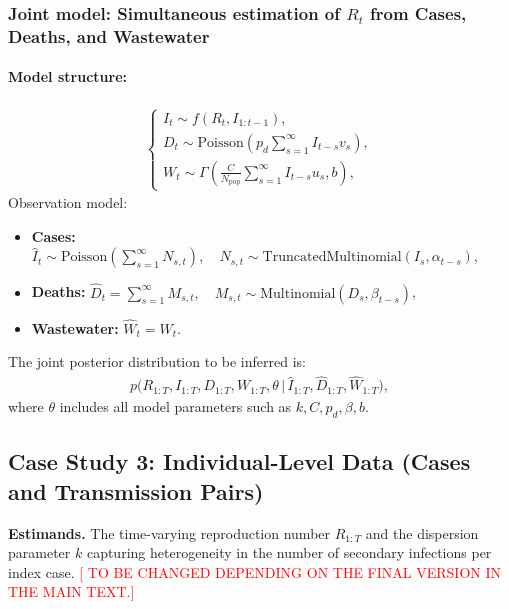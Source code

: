 \documentclass{article}
\begin{document}
\subsubsection{Joint model: Simultaneous estimation of $R_t$ from Cases, Deaths, and Wastewater}

\paragraph{Model structure:}

\begin{align}
\begin{cases}
I_t \sim f(R_t, I_{1:t-1}), \\[6pt]
D_t \sim \mathrm{Poisson}\left(p_d \sum_{s=1}^\infty I_{t-s} v_s \right), \\[6pt]
W_t \sim \Gamma\left(\frac{C}{N_{\mathrm{pop}}} \sum_{s=1}^\infty I_{t-s} u_s, b \right),
\end{cases}
\end{align}
Observation model:
\begin{itemize}
    \item \textbf{Cases:} $\widehat{I}_t \sim \mathrm{Poisson}\left(\sum_{s=1}^\infty N_{s,t}\right), \quad N_{s,t} \sim \mathrm{TruncatedMultinomial}(I_s, \alpha_{t-s})$,
    \item \textbf{Deaths:} $\widehat{D}_t = \sum_{s=1}^\infty M_{s,t}, \quad M_{s,t} \sim \mathrm{Multinomial}(D_s, \beta_{t-s})$,
    \item \textbf{Wastewater:} $\widehat{W}_t = W_t$.
\end{itemize}
The joint posterior distribution to be inferred is:
\begin{align}
p\big(R_{1:T}, I_{1:T}, D_{1:T}, W_{1:T}, \theta \,\big|\, \widehat{I}_{1:T}, \widehat{D}_{1:T}, \widehat{W}_{1:T}\big),
\end{align}
where $\theta$ includes all model parameters such as $k, C, p_d, \beta, b$.


\subsection{Case Study 3: Individual-Level Data (Cases and Transmission Pairs)}

\noindent\textbf{Estimands.} The time-varying reproduction number $R_{1:T}$ and the dispersion parameter $k$ capturing heterogeneity in the number of secondary infections per index case. \textcolor{red}{[ TO BE CHANGED DEPENDING ON THE FINAL VERSION IN THE MAIN TEXT.]}
\end{document}
